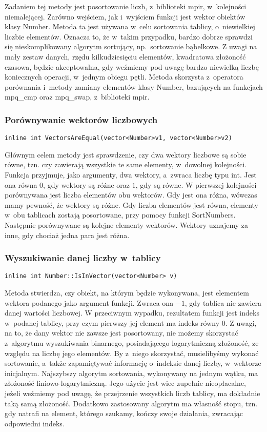 Zadaniem tej metody jest posortowanie liczb, z~biblioteki mpir, w~kolejności niemalejącej. Zarówno wejściem, jak i~wyjściem funkcji jest wektor obiektów klasy Number. Metoda ta jest używana w~celu sortowania tablicy, o~niewielkiej liczbie elementów. Oznacza to, że w~takim przypadku, bardzo dobrze sprawdzi się nieskomplikowany algorytm sortujący, np.\ sortowanie bąbelkowe. Z uwagi na mały zestaw danych, rzędu kilkudziesięciu elementów, kwadratowa złożoność czasowa, będzie akceptowalna, gdy weźmiemy pod uwagę bardzo niewielką liczbę koniecznych operacji, w~jednym obiegu pętli. Metoda skorzysta z~operatora porównania i~metody zamiany elementów klasy Number, bazujących na funkcjach mpq\_cmp oraz mpq\_swap, z~biblioteki mpir.

\subsubsection{Porównywanie wektorów liczbowych}
\begin{lstlisting}
inline int VectorsAreEqual(vector<Number>v1, vector<Number>v2)
\end{lstlisting}

Głównym celem metody jest sprawdzenie, czy dwa wektory liczbowe są sobie równe, tzn. czy zawierają wszystkie te same elementy, w~dowolnej kolejności. Funkcja przyjmuje, jako argumenty, dwa wektory, a~zwraca liczbę typu int. Jest ona równa $0$, gdy wektory są różne oraz $1$, gdy są równe. W pierwszej kolejności porównywana jest liczba elementów obu wektorów. Gdy jest ona różna, wówczas mamy pewność, że wektory są różne. Gdy liczba elementów jest równa, elementy w~obu tablicach zostają posortowane, przy pomocy funkcji SortNumbers. Następnie porównywane są kolejne elementy wektorów. Wektory uznajemy za inne, gdy chociaż jedna para jest różna.

\subsubsection{Wyszukiwanie danej liczby w~tablicy}
\begin{lstlisting}
inline int Number::IsInVector(vector<Number> v)
\end{lstlisting}

Metoda stwierdza, czy obiekt, na którym będzie wykonywana, jest elementem wektora podanego jako argument funkcji. Zwraca ona $-1$, gdy tablica nie zawiera danej wartości liczbowej. W przeciwnym wypadku, rezultatem funkcji jest indeks w~podanej tablicy, przy czym pierwszy jej element ma indeks równy $0$. Z uwagi, na to, że dany wektor nie zawsze jest posortowany, nie możemy skorzystać z~algorytmu wyszukiwania binarnego, posiadającego logarytmiczną złożoność, ze względu na liczbę jego elementów. By z~niego skorzystać, musielibyśmy wykonać sortowanie, a~także zapamiętywać informację o~indeksie danej liczby, w~wektorze inicjalnym. Najszybszy algorytm sortowania, wykonywany na jednym wątku, ma złożoność liniowo-logarytmiczną. Jego użycie jest wiec zupełnie nieopłacalne, jeżeli weźmiemy pod uwagę, że przejrzenie wszystkich liczb tablicy, ma dokładnie taką samą złożoność. Dodatkowo zastosowany algorytm ma własność stopu, tzn. gdy natrafi na element, którego szukamy, kończy swoje działania, zwracając odpowiedni indeks.

